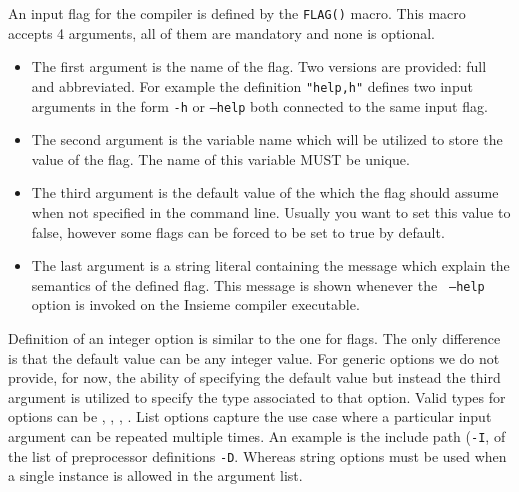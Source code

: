 An input flag for the compiler is defined by the {\tt FLAG()} macro. This macro
accepts 4 arguments, all of them are mandatory and none is optional. 
\begin{itemize}
\item The first argument is the name of the flag. Two versions are provided:
full and abbreviated. For example the definition {\tt "help,h"} defines two
input arguments in the form {\tt -h} or {\tt --help} both connected to the same
input flag.  

\item The second argument is the variable name which will be
utilized to store the value of the flag. The name of this variable MUST be
unique. 

\item The third argument is the default value of the which the flag should
assume when not specified in the command line. Usually you want to set this
value to false, however some flags can be forced to be set to true by default. 

\item The last argument is a string literal containing the message which explain
the semantics of the defined flag. This message is shown whenever the {\tt
--help} option is invoked on the Insieme compiler executable. 
\end{itemize}

Definition of an integer option is similar to the one for flags. The only
difference is that the default value can be any integer value. For generic
options we do not provide, for now, the ability of specifying the default value
but instead the third argument is utilized to specify the type associated to
that option.  Valid types for options can be ,
, , . List
options capture the use case where a particular input argument can be repeated
multiple times. An example is the include path ({\tt -I}, of the list of
preprocessor definitions {\tt -D}.  Whereas string options must be used when a
single instance is allowed in the argument list. 

